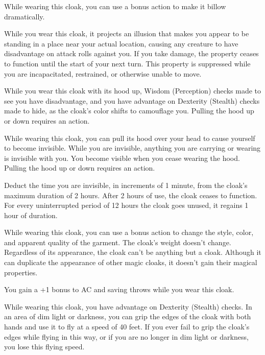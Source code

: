 \documentclass[10pt,a4paper,twoside,bg=print,twocolumn,openany,nodeprecatedcode]{dndbook}
\begin{document}
While wearing this cloak, you can use a bonus action to make it billow dramatically.

While you wear this cloak, it projects an illusion that makes you appear to be standing in a place near your actual location, causing any creature to have disadvantage on attack rolls against you. If you take damage, the property ceases to function until the start of your next turn. This property is suppressed while you are incapacitated, restrained, or otherwise unable to move.

While you wear this cloak with its hood up, Wisdom (Perception) checks made to see you have disadvantage, and you have advantage on Dexterity (Stealth) checks made to hide, as the cloak's color shifts to camouflage you. Pulling the hood up or down requires an action.

While wearing this cloak, you can pull its hood over your head to cause yourself to become invisible. While you are invisible, anything you are carrying or wearing is invisible with you. You become visible when you cease wearing the hood. Pulling the hood up or down requires an action.

Deduct the time you are invisible, in increments of 1 minute, from the cloak's maximum duration of 2 hours. After 2 hours of use, the cloak ceases to function. For every uninterrupted period of 12 hours the cloak goes unused, it regains 1 hour of duration.

While wearing this cloak, you can use a bonus action to change the style, color, and apparent quality of the garment. The cloak's weight doesn't change. Regardless of its appearance, the cloak can't be anything but a cloak. Although it can duplicate the appearance of other magic cloaks, it doesn't gain their magical properties.

You gain a +1 bonus to AC and saving throws while you wear this cloak.

While wearing this cloak, you have advantage on Dexterity (Stealth) checks. In an area of dim light or darkness, you can grip the edges of the cloak with both hands and use it to fly at a speed of 40 feet. If you ever fail to grip the cloak's edges while flying in this way, or if you are no longer in dim light or darkness, you lose this flying speed.
\end{document}
